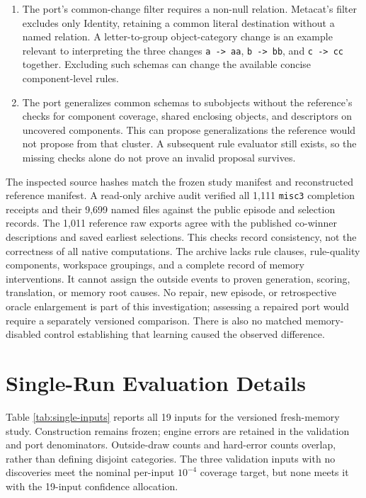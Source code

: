 \documentclass[10pt,letterpaper]{article}
\newcommand{\tightlist}{\setlength{\itemsep}{0pt}\setlength{\parskip}{0pt}}
\begin{document}
\begin{enumerate}
\def\labelenumi{\arabic{enumi}.}
\tightlist
\item
  The port's common-change filter requires a non-null relation. Metacat's filter excludes
  only Identity, retaining a common literal destination without a named relation. A
  letter-to-group object-category change is an example relevant to interpreting the three
  changes \texttt{a\ -\textgreater{}\ aa}, \texttt{b\ -\textgreater{}\ bb}, and
  \texttt{c\ -\textgreater{}\ cc} together. Excluding such schemas can change the
  available concise component-level rules.
\item
  The port generalizes common schemas to subobjects without the reference's checks for
  component coverage, shared enclosing objects, and descriptors on uncovered components.
  This can propose generalizations the reference would not propose from that cluster. A
  subsequent rule evaluator still exists, so the missing checks alone do not prove an
  invalid proposal survives.
\end{enumerate}

The inspected source hashes match the frozen study manifest and reconstructed reference
manifest. A read-only archive audit verified all 1,111 \texttt{misc3} completion receipts
and their 9,699 named files against the public episode and selection records. The 1,011
reference raw exports agree with the published co-winner descriptions and saved earliest
selections. This checks record consistency, not the correctness of all native
computations. The archive lacks rule clauses, rule-quality components, workspace
groupings, and a complete record of memory interventions. It cannot assign the outside
events to proven generation, scoring, translation, or memory root causes. No repair, new
episode, or retrospective oracle enlargement is part of this investigation; assessing a
repaired port would require a separately versioned comparison. There is also no matched
memory-disabled control establishing that learning caused the observed difference.

\clearpage

\section{Single-Run Evaluation Details}\label{app:single-study}

Table \ref{tab:single-inputs} reports all 19 inputs for the versioned fresh-memory study.
Construction remains frozen; engine errors are retained in the validation and port
denominators. Outside-draw counts and hard-error counts overlap, rather than defining
disjoint categories. The three validation inputs with no discoveries meet the nominal
per-input \(10^{-4}\) coverage target, but none meets it with the 19-input confidence
allocation.
\end{document}

